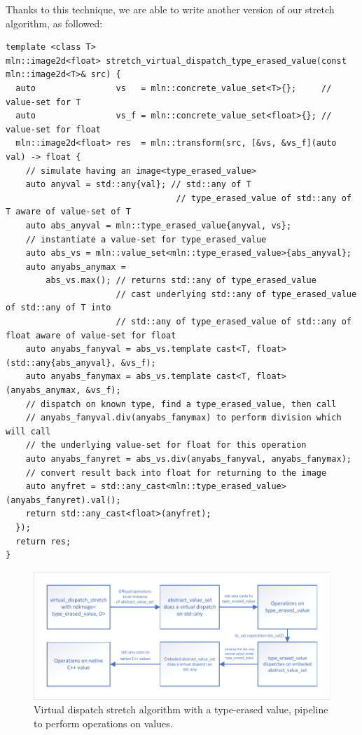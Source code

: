 Thanks to this technique, we are able to write another version of our stretch algorithm, as followed:
\begin{verbatim}
template <class T>
mln::image2d<float> stretch_virtual_dispatch_type_erased_value(const mln::image2d<T>& src) {
  auto                vs   = mln::concrete_value_set<T>{};     // value-set for T
  auto                vs_f = mln::concrete_value_set<float>{}; // value-set for float
  mln::image2d<float> res  = mln::transform(src, [&vs, &vs_f](auto val) -> float {
    // simulate having an image<type_erased_value>
    auto anyval = std::any{val}; // std::any of T
                                  // type_erased_value of std::any of T aware of value-set of T
    auto abs_anyval = mln::type_erased_value{anyval, vs};
    // instantiate a value-set for type_erased_value
    auto abs_vs = mln::value_set<mln::type_erased_value>{abs_anyval};
    auto anyabs_anymax =
        abs_vs.max(); // returns std::any of type_erased_value
                      // cast underlying std::any of type_erased_value of std::any of T into
                      // std::any of type_erased_value of std::any of float aware of value-set for float
    auto anyabs_fanyval = abs_vs.template cast<T, float>(std::any{abs_anyval}, &vs_f);
    auto anyabs_fanymax = abs_vs.template cast<T, float>(anyabs_anymax, &vs_f);
    // dispatch on known type, find a type_erased_value, then call
    // anyabs_fanyval.div(anyabs_fanymax) to perform division which will call
    // the underlying value-set for float for this operation
    auto anyabs_fanyret = abs_vs.div(anyabs_fanyval, anyabs_fanymax);
    // convert result back into float for returning to the image
    auto anyfret = std::any_cast<mln::type_erased_value>(anyabs_fanyret).val();
    return std::any_cast<float>(anyfret);
  });
  return res;
}
\end{verbatim}

\begin{figure}[htbp]
  \centering
  \includegraphics[width=.8\linewidth]{figs/static_dynamic_bridge/virtual_dispatch_type_erased_value_stretch}
  \caption{Virtual dispatch stretch algorithm with a type-erased value, pipeline to perform operations on values.}
  \label{fig:static_dyn.virtual_dispatch_type_erased_value_stretch}
\end{figure}

